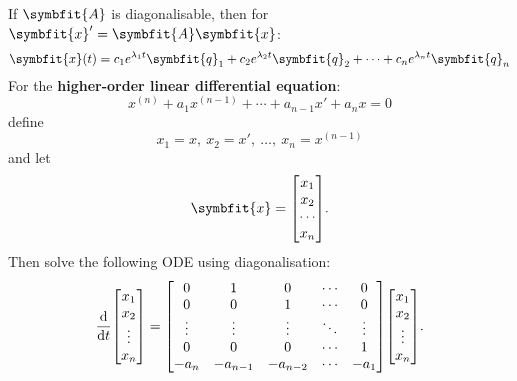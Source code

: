 \documentclass{article}
\begin{document}
\begin{multicols*}{2}
    If \(\symbfit{A}\) is diagonalisable, then for \(\symbfit{x}' = \symbfit{A} \symbfit{x}\):
    \begin{equation*}
        \symbfit{x}(t) = c_1 e^{\lambda_1 t} \symbfit{q}_1 + c_2 e^{\lambda_2 t} \symbfit{q}_2 + \cdots + c_n e^{\lambda_n t} \symbfit{q}_n
    \end{equation*}
    For the \textbf{higher-order linear differential equation}:
    \begin{equation*}
        x^{\left( n \right)} + a_1 x^{\left( n-1 \right)} + \cdots + a_{n-1} x' + a_n x = 0
    \end{equation*}
    define
    \begin{equation*}
        x_1 = x,\: x_2 = x',\: \dots,\: x_n = x^{\left( n-1 \right)}
    \end{equation*}
    and let
    \begin{equation*}
        \symbfit{x}=\mqty[x_1 \\ x_2 \\ \cdots \\ x_n].
    \end{equation*}
    Then solve the following ODE using diagonalisation:
    \begin{equation*}
        \dv{t}\mqty[
            x_1 \\
            x_2 \\
            \vdotswithin{x_3} \\
            x_n
        ] = \mqty[
        0 & 1 & 0 & \cdots & 0 \\
        0 & 0 & 1 & \cdots & 0 \\
        \vdots & \vdots & \vdots & \ddots & \vdots \\
        0 & 0 & 0 & \cdots & 1 \\
        -a_n & -a_{n-1} & -a_{n-2} & \cdots & -a_1
        ] \mqty[
            x_1 \\
            x_2 \\
            \vdotswithin{x_3} \\
            x_n
        ].
    \end{equation*}

\end{multicols*}
\end{document}
